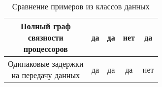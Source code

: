 \begin{table}[!htbp]
\begin{tabular}{c|c|c|c|c}
        \hline
        \makecell{Полный граф                                                                       \\связности\\процессоров}      & да                                         & да     & нет                    & да                     \\
        \hline
        \makecell{Одинаковые задержки                                                               \\на передачу данных} & да                                         & да     & да                     & нет                    \\
    \end{tabular}
    \caption{Сравнение примеров из классов данных}

\end{table}
